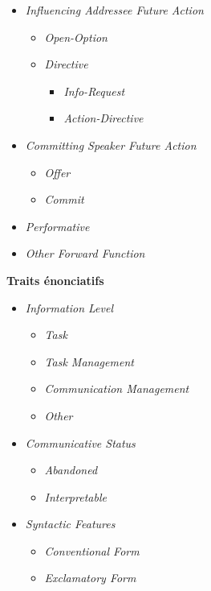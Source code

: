 \documentclass[10pt,a4paper,twoside]{article}
\begin{document}
\begin{center}
{\begin{itemize}[topsep=0pt,itemsep=-2pt,leftmargin=15pt]
	\item \textit{Influencing Addressee Future Action}
	\begin{itemize}
		\item \textit{Open-Option}
		\item \textit{Directive}
		\begin{itemize}
			\item \textit{Info-Request}
			\item \textit{Action-Directive}
		\end{itemize}
	\end{itemize}
	\item \textit{Committing Speaker Future Action}
	\begin{itemize}
		\item \textit{Offer}
		\item \textit{Commit}
	\end{itemize}
	\item \textit{Performative}
	\item \textit{Other Forward Function}
\end{itemize}

}%
\parbox[t]{2.2in}{\raggedright%
\textbf{Traits énonciatifs}
\begin{itemize}[topsep=0pt,itemsep=-2pt,leftmargin=15pt]
	\item \textit{Information Level}
	\begin{itemize}
		\item \textit{Task}
		\item \textit{Task Management}
		\item \textit{Communication Management}
		\item \textit{Other}
	\end{itemize}
	\item \textit{Communicative Status}
	\begin{itemize}
		\item \textit{Abandoned}
		\item \textit{Interpretable}
	\end{itemize}
	\item \textit{Syntactic Features}
	\begin{itemize}
		\item \textit{Conventional Form}
		\item \textit{Exclamatory Form}
	\end{itemize}
\end{itemize}

}

\end{center}
\end{document}
